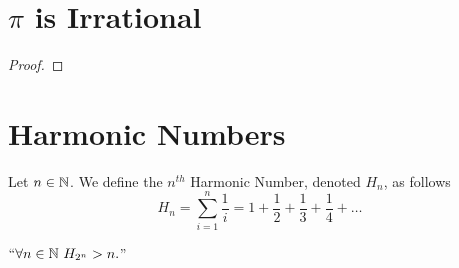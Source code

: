    \section{$\pi$ is Irrational}
        \begin{definition}
        \end{definition}
        \begin{theorem}
        \end{theorem}
        \begin{proof}
        \end{proof}
    \section{Harmonic Numbers}
        \begin{definition}
            Let $n \in \mathbb{N}$. We define the $n^{th}$ Harmonic Number, denoted $H_n$, as follows
            \[
                H_n = \sum_{i = 1}^{n} \frac{1}{i} = 1 + \frac{1}{2} + \frac{1}{3} + \frac{1}{4} + \dots
            \]
        \end{definition}
        \begin{theorem}
            $``\forall n \in \mathbb{N} \ H_{2^n} > n.$''
        \end{theorem}

